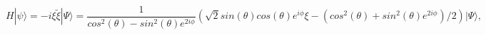 \begin{equation}
H|\psi \rangle=-i\xi{\widetilde \xi}|\Psi \rangle=
\frac{1}{cos^2(\theta)-sin^2(\theta)e^{2i\phi}}
(\sqrt{2}sin(\theta)cos(\theta)e^{i\phi}\xi -
(cos^2(\theta)+sin^2(\theta)e^{2i\phi})/2)|\Psi\rangle,
\end{equation}

